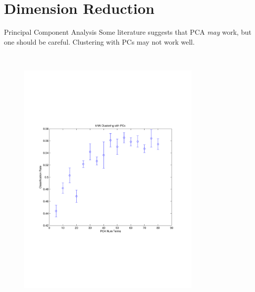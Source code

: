 \documentclass[xcolor=dvipsnames,t]{beamer} %
\begin{document}
\section{Dimension Reduction}
\begin{frame}{Principal Component Analysis}
   Some literature suggests that PCA \emph{may} work, but one should be careful.  Clustering with PCs may not work well.

   ~\\[-7em]
   \begin{figure}
      \centering
      \includegraphics[width=0.8\textwidth]{figures/optimkNNPCA.pdf}
   \end{figure}
\end{frame}
\end{document}
